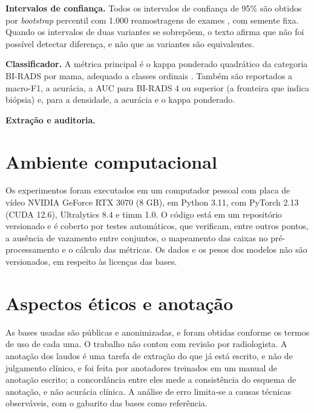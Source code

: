 \textbf{Intervalos de confiança.} Todos os intervalos de confiança de 95\% são obtidos por \textit{bootstrap} percentil com 1.000 reamostragens de exames \cite{efron1993bootstrap}, com semente fixa. Quando os intervalos de duas variantes se sobrepõem, o texto afirma que não foi possível detectar diferença, e não que as variantes são equivalentes.

\textbf{Classificador.} A métrica principal é o kappa ponderado quadrático da categoria BI-RADS por mama, adequado a classes ordinais \cite{cohen1960kappa}. Também são reportados a macro-F1, a acurácia, a AUC para BI-RADS 4 ou superior (a fronteira que indica biópsia) e, para a densidade, a acurácia e o kappa ponderado.

\textbf{Extração e auditoria.} 

\section{Ambiente computacional}

Os experimentos foram executados em um computador pessoal com placa de vídeo NVIDIA GeForce RTX 3070 (8 GB), em Python 3.11, com PyTorch 2.13 (CUDA 12.6), Ultralytics 8.4 e timm 1.0. O código está em um repositório versionado e é coberto por testes automáticos, que verificam, entre outros pontos, a ausência de vazamento entre conjuntos, o mapeamento das caixas no pré-processamento e o cálculo das métricas. Os dados e os pesos dos modelos não são versionados, em respeito às licenças das bases.

\section{Aspectos éticos e anotação}

As bases usadas são públicas e anonimizadas, e foram obtidas conforme os termos de uso de cada uma. O trabalho não contou com revisão por radiologista. A anotação dos laudos é uma tarefa de extração do que já está escrito, e não de julgamento clínico, e foi feita por anotadores treinados em um manual de anotação escrito; a concordância entre eles mede a consistência do esquema de anotação, e não acurácia clínica. A análise de erro limita-se a causas técnicas observáveis, com o gabarito das bases como referência.
